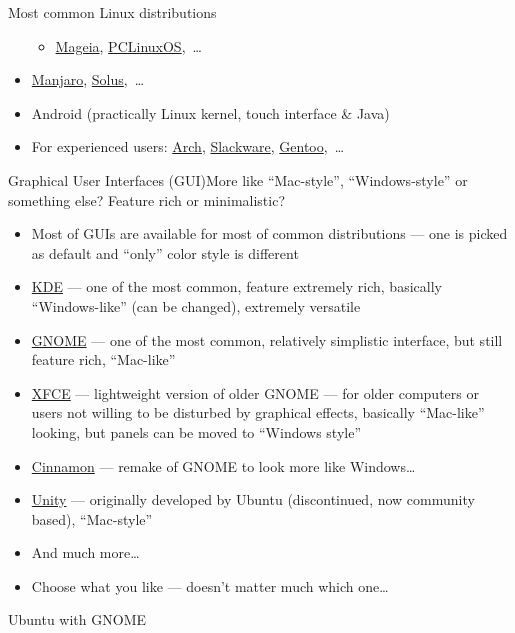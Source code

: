 \documentclass[compress, ucs, xelatex, 11pt, xcolor=svgnames, aspectratio=169,
	hyperref={
		bookmarks=true,
		unicode=true,
		colorlinks=true,
		pdftitle={Linux, command line and MetaCentrum},
		plainpages=false,
		pdfauthor={Vojtech Zeisek},
		pdfsubject={Course about use of Linux command line, writing shell scripts and using MetaCentrum of CESNET},
		pdfcreator={XeLaTeX},
		pdfkeywords={Linux, GNU, BASH, shell, command line, MetaCentrum},
		linkcolor=DarkRed, %
		anchorcolor=DarkBlue, %
		citecolor=Indigo, %
		filecolor=NavyBlue, %
		menucolor=DarkMagenta, %
		urlcolor=DarkBlue, %
		pdftex},
	url={hyphens, lowtilde} %
	]{beamer}
\renewcommand{\texttt}[1]{\colorbox{Beige}{{\ttfamily #1}}}
\begin{document}
\begin{frame}{Most common Linux distributions}
\begin{itemize}
\begin{itemize}
			\item \href{https://www.mageia.org/}{Mageia}, \href{https://www.pclinuxos.com/}{PCLinuxOS},~\ldots
		\end{itemize}
		\item \href{https://manjaro.org/}{Manjaro}, \href{https://getsol.us/}{Solus},~\ldots
		\item Android (practically Linux kernel, touch interface \& Java)
		\item For experienced users: \href{https://archlinux.org/}{Arch}, \href{http://www.slackware.com/}{Slackware}, \href{https://www.gentoo.org/}{Gentoo},~\ldots
	\end{itemize}
\end{frame}

\begin{frame}{Graphical User Interfaces (GUI)}{More like \enquote{Mac-style}, \enquote{Windows-style} or something else? Feature rich or minimalistic?}
	\begin{itemize}
		\item Most of GUIs are available for most of common distributions --- one is picked as default and \enquote{only} color style is different
		\item \href{https://kde.org/}{KDE} --- one of the most common, feature extremely rich, basically \enquote{Windows-like} (can be changed), extremely versatile
		\item \href{https://www.gnome.org/}{GNOME} --- one of the most common, relatively simplistic interface, but still feature rich, \enquote{Mac-like}
		\item \href{https://xfce.org/}{XFCE} --- lightweight version of older GNOME --- for older computers or users not willing to be disturbed by graphical effects, basically \enquote{Mac-like} looking, but panels can be moved to \enquote{Windows style}
		\item \href{https://cinnamon-spices.linuxmint.com/}{Cinnamon} --- remake of GNOME to look more like Windows\ldots
		\item \href{https://code.launchpad.net/unity}{Unity} --- originally developed by Ubuntu (discontinued, now community based), \enquote{Mac-style}
		\item And much more\ldots
		\item Choose what you like --- doesn't matter much which one\ldots
	\end{itemize}
\end{frame}

\begin{frame}{Ubuntu with GNOME} %
	\begin{center}
		\texttt{[image: ubuntu.png]}
	\end{center}
\end{frame}
\end{document}
